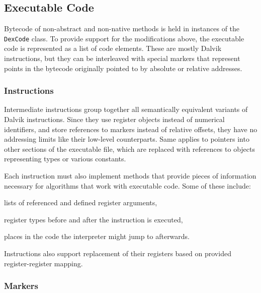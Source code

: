 \documentclass[12pt,twoside,notitlepage]{report}
\begin{document}
\subsection{Executable Code}

Bytecode of non-abstract and non-native methods is held in instances of the \verb$DexCode$ class. To provide support for the modifications above, the executable code is represented as a list of code elements. These are mostly Dalvik instructions, but they can be interleaved with special markers that represent points in the bytecode originally pointed to by absolute or relative addresses.

\subsubsection{Instructions}

Intermediate instructions group together all semantically equivalent variants of Dalvik instructions. Since they use register objects instead of numerical identifiers, and store references to markers instead of relative offsets, they have no addressing limits like their low-level counterparts. Same applies to pointers into other sections of the executable file, which are replaced with references to objects representing types or various constants. 

Each instruction must also implement methods that provide pieces of information necessary for algorithms that work with executable code. Some of these include:
\begin{inparaenum}[(i)]
\item lists of referenced and defined register arguments,
\item register types before and after the instruction is executed,
\item places in the code the interpreter might jump to afterwards.
\end{inparaenum}
Instructions also support replacement of their registers based on provided register-register mapping.

\subsubsection{Markers}
\end{document}
